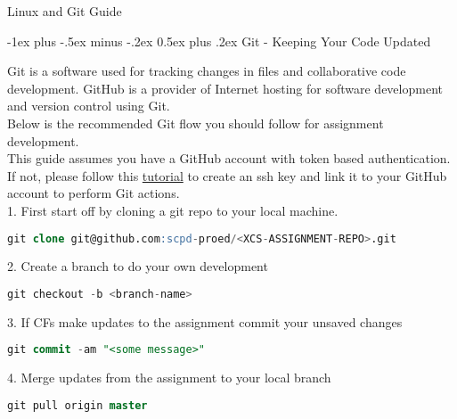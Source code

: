 \documentclass[10pt,landscape]{article}
\makeatletter
\renewcommand{\section}{\@startsection{section}{1}{0mm}%
                                {-1ex plus -.5ex minus -.2ex}%
                                {0.5ex plus .2ex}%
                                {\normalfont\large\bfseries}}
\makeatother
\begin{document}
\begin{multicols}{2}


\setlength{\premulticols}{1pt}
\setlength{\postmulticols}{1pt}
\setlength{\multicolsep}{1pt}
\setlength{\columnsep}{2pt}

\begin{center}
     \Large{Linux and Git Guide} \\
\end{center}

\section{Git - Keeping Your Code Updated}

Git is a software used for tracking changes in files and collaborative code development. 
GitHub is a provider of Internet hosting for software development and version control using Git. \\

Below is the recommended Git flow you should follow for assignment development. \\

This guide assumes you have a GitHub account with token based authentication. If not, please follow this \href{https://docs.github.com/en/github/authenticating-to-github/connecting-to-github-with-ssh/generating-a-new-ssh-key-and-adding-it-to-the-ssh-agent}{tutorial} to create an ssh key and link it to your GitHub account to perform Git actions. \\

1. First start off by cloning a git repo to your local machine.
\begin{lstlisting}[language=SQL]
    git clone git@github.com:scpd-proed/<XCS-ASSIGNMENT-REPO>.git
\end{lstlisting}

2. Create a branch to do your own development
\begin{lstlisting}[language=SQL]
    git checkout -b <branch-name>
\end{lstlisting}

3. If CFs make updates to the assignment commit your unsaved changes
\begin{lstlisting}[language=SQL]
    git commit -am "<some message>"
\end{lstlisting}

4. Merge updates from the assignment to your local branch
\begin{lstlisting}[language=SQL]
    git pull origin master
\end{lstlisting}


\end{multicols}
\end{document}
